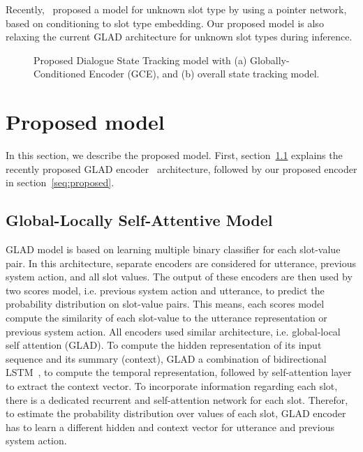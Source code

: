 \documentclass{article}
\begin{document}
Recently,~\cite{Xu2018AnEA} proposed a model for unknown slot type by using a pointer network, based on conditioning to slot type embedding. Our proposed model is also relaxing the current GLAD architecture for unknown slot types during inference. 


\begin{figure*}[t]
\centering
{}\hspace{1em}
  
  \caption{Proposed Dialogue State Tracking model with (a) Globally-Conditioned Encoder (GCE), and (b) overall state tracking model. }
\label{fig:gce-encoder}
  \end{figure*}


\section{Proposed model}
\label{sec:proposed}

In this section, we describe the proposed model. First, section~\ref{seq:glad} explains the recently proposed GLAD encoder~\citep{Zhong2018GlobalLocallySD} architecture, followed by our proposed encoder in section~\ref{seq:proposed}.


\subsection{Global-Locally Self-Attentive Model}
\label{seq:glad}
GLAD model is based on learning multiple binary classifier for each slot-value pair. In this architecture, separate encoders are considered for utterance, previous system action, and all slot values. The output of these encoders are then used by two scores model, i.e. previous system action and utterance, to predict the probability distribution on slot-value pairs. This means, each scores model compute the similarity of each slot-value to the utterance representation or previous system action. All encoders used similar architecture, i.e. global-local self attention (GLAD). To compute the hidden representation of its input sequence and its summary (context), GLAD a combination of bidirectional LSTM~\citep{Hochreiter1997LongSM}, to compute the temporal representation, followed by self-attention layer to extract the context vector. To incorporate information regarding each slot, there is a dedicated recurrent and self-attention network for each slot. Therefor, to estimate the probability distribution over values of each slot, GLAD encoder has to learn a different hidden and context vector for utterance and previous system action.  
\end{document}
